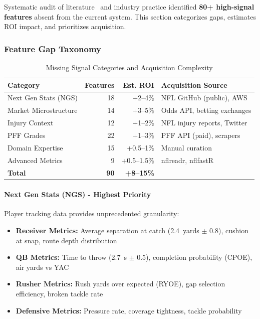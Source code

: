 Systematic audit of literature~\cite{lopez2020big, yurko2020going, deshpande2016estimating} and industry practice identified \textbf{80+ high-signal features} absent from the current system. This section categorizes gaps, estimates ROI impact, and prioritizes acquisition.

\subsubsection{Feature Gap Taxonomy}

\begin{table}[htbp]
\centering
\small
\caption{Missing Signal Categories and Acquisition Complexity}
\label{tab:missing_signals_taxonomy}
\begin{tabular}{@{}lrrp{4.5cm}@{}}
\toprule
\textbf{Category} & \textbf{Features} & \textbf{Est. ROI} & \textbf{Acquisition Source} \\
\midrule
Next Gen Stats (NGS) & 18 & +2--4\% & NFL GitHub (public), AWS \\
Market Microstructure & 14 & +3--5\% & Odds API, betting exchanges \\
Injury Context & 12 & +1--2\% & NFL injury reports, Twitter \\
PFF Grades & 22 & +1--3\% & PFF API (paid), scrapers \\
Domain Expertise & 15 & +0.5--1\% & Manual curation \\
Advanced Metrics & 9 & +0.5--1.5\% & nflreadr, nflfastR \\
\midrule
\textbf{Total} & \textbf{90} & \textbf{+8--15\%} & \\
\bottomrule
\end{tabular}
\end{table}

\paragraph{Next Gen Stats (NGS) - Highest Priority}

Player tracking data provides unprecedented granularity:

\begin{itemize}
    \item \textbf{Receiver Metrics:} Average separation at catch (\SI{2.4}{yards} $\pm$ \SI{0.8}{}), cushion at snap, route depth distribution
    \item \textbf{QB Metrics:} Time to throw (\SI{2.7}{s} $\pm$ \SI{0.5}{}), completion probability (CPOE), air yards vs YAC
    \item \textbf{Rusher Metrics:} Rush yards over expected (RYOE), gap selection efficiency, broken tackle rate
    \item \textbf{Defensive Metrics:} Pressure rate, coverage tightness, tackle probability
\end{itemize}


